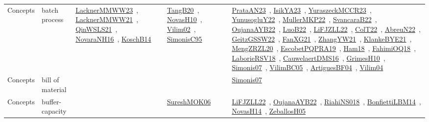 {\begin{longtable}{lp{3cm}>{\raggedright\arraybackslash}p{6cm}>{\raggedright\arraybackslash}p{6cm}>{\raggedright\arraybackslash}p{8cm}}
Concepts & batch process & \href{works/LacknerMMWW23.pdf}{LacknerMMWW23}~\cite{LacknerMMWW23}, \href{works/LacknerMMWW21.pdf}{LacknerMMWW21}~\cite{LacknerMMWW21}, \href{works/QinWSLS21.pdf}{QinWSLS21}~\cite{QinWSLS21}, \href{works/NovaraNH16.pdf}{NovaraNH16}~\cite{NovaraNH16}, \href{works/KoschB14.pdf}{KoschB14}~\cite{KoschB14} & \href{works/TangB20.pdf}{TangB20}~\cite{TangB20}, \href{works/NovasH10.pdf}{NovasH10}~\cite{NovasH10}, \href{works/Vilim02.pdf}{Vilim02}~\cite{Vilim02}, \href{works/SimonisC95.pdf}{SimonisC95}~\cite{SimonisC95} & \href{works/PrataAN23.pdf}{PrataAN23}~\cite{PrataAN23}, \href{works/IsikYA23.pdf}{IsikYA23}~\cite{IsikYA23}, \href{works/YuraszeckMCCR23.pdf}{YuraszeckMCCR23}~\cite{YuraszeckMCCR23}, \href{works/YunusogluY22.pdf}{YunusogluY22}~\cite{YunusogluY22}, \href{works/MullerMKP22.pdf}{MullerMKP22}~\cite{MullerMKP22}, \href{works/SvancaraB22.pdf}{SvancaraB22}~\cite{SvancaraB22}, \href{works/OujanaAYB22.pdf}{OujanaAYB22}~\cite{OujanaAYB22}, \href{works/LuoB22.pdf}{LuoB22}~\cite{LuoB22}, \href{works/LiFJZLL22.pdf}{LiFJZLL22}~\cite{LiFJZLL22}, \href{works/ColT22.pdf}{ColT22}~\cite{ColT22}, \href{works/AbreuN22.pdf}{AbreuN22}~\cite{AbreuN22}, \href{works/GeitzGSSW22.pdf}{GeitzGSSW22}~\cite{GeitzGSSW22}, \href{works/FanXG21.pdf}{FanXG21}~\cite{FanXG21}, \href{works/ZhangYW21.pdf}{ZhangYW21}~\cite{ZhangYW21}, \href{works/KlankeBYE21.pdf}{KlankeBYE21}~\cite{KlankeBYE21}, \href{works/MengZRZL20.pdf}{MengZRZL20}~\cite{MengZRZL20}, \href{works/EscobetPQPRA19.pdf}{EscobetPQPRA19}~\cite{EscobetPQPRA19}, \href{works/Ham18.pdf}{Ham18}~\cite{Ham18}, \href{works/FahimiOQ18.pdf}{FahimiOQ18}~\cite{FahimiOQ18}, \href{works/LaborieRSV18.pdf}{LaborieRSV18}~\cite{LaborieRSV18}, \href{works/CauwelaertDMS16.pdf}{CauwelaertDMS16}~\cite{CauwelaertDMS16}, \href{works/GrimesH10.pdf}{GrimesH10}~\cite{GrimesH10}, \href{works/Simonis07.pdf}{Simonis07}~\cite{Simonis07}, \href{works/VilimBC05.pdf}{VilimBC05}~\cite{VilimBC05}, \href{works/ArtiguesBF04.pdf}{ArtiguesBF04}~\cite{ArtiguesBF04}, \href{works/Vilim04.pdf}{Vilim04}~\cite{Vilim04}\\
Concepts & bill of material &  &  & \href{works/Simonis07.pdf}{Simonis07}~\cite{Simonis07}\\
Concepts & buffer-capacity &  & \href{works/SureshMOK06.pdf}{SureshMOK06}~\cite{SureshMOK06} & \href{works/LiFJZLL22.pdf}{LiFJZLL22}~\cite{LiFJZLL22}, \href{works/OujanaAYB22.pdf}{OujanaAYB22}~\cite{OujanaAYB22}, \href{works/RiahiNS018.pdf}{RiahiNS018}~\cite{RiahiNS018}, \href{works/BonfiettiLBM14.pdf}{BonfiettiLBM14}~\cite{BonfiettiLBM14}, \href{works/NovasH14.pdf}{NovasH14}~\cite{NovasH14}, \href{works/ZeballosH05.pdf}{ZeballosH05}~\cite{ZeballosH05}\\

\end{longtable}}
